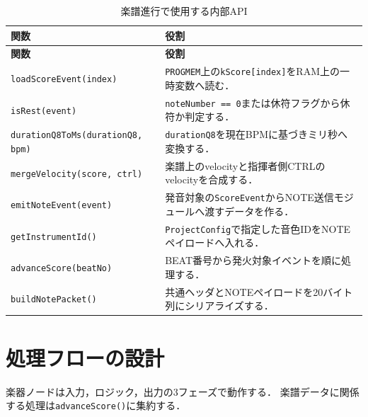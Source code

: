 \documentclass[lualatex,book,paper=a4paper,jafontsize=11.5pt,jafontscale=1.05]{jlreq}
\newcommand{\code}[1]{\texttt{#1}}
\begin{document}
\begin{longtable}{p{}p{}}
\caption{楽譜進行で使用する内部API}\label{tab:saito-api}\\
\toprule
\textbf{関数} & \textbf{役割} \\
\midrule
\endfirsthead
\toprule
\textbf{関数} & \textbf{役割} \\
\midrule
\endhead
\code{loadScoreEvent(index)} &
\code{PROGMEM}上の\code{kScore[index]}をRAM上の一時変数へ読む．\\
\code{isRest(event)} &
\code{noteNumber == 0}または休符フラグから休符か判定する．\\
\code{durationQ8ToMs(durationQ8, bpm)} &
\code{durationQ8}を現在BPMに基づきミリ秒へ変換する．\\
\code{mergeVelocity(score, ctrl)} &
楽譜上のvelocityと指揮者側CTRLのvelocityを合成する．\\
\code{emitNoteEvent(event)} &
発音対象の\code{ScoreEvent}からNOTE送信モジュールへ渡すデータを作る．\\
\code{getInstrumentId()} &
\code{ProjectConfig}で指定した音色IDをNOTEペイロードへ入れる．\\
\code{advanceScore(beatNo)} &
BEAT番号から発火対象イベントを順に処理する．\\
\code{buildNotePacket()} &
共通ヘッダとNOTEペイロードを20バイト列にシリアライズする．\\
\bottomrule
\end{longtable}

\section{処理フローの設計}

楽器ノードは入力，ロジック，出力の3フェーズで動作する．
楽譜データに関係する処理は\code{advanceScore()}に集約する．
\end{document}
